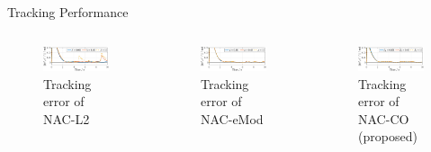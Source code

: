 \documentclass[8pt, aspectratio=169, handout]{beamer}
\begin{document}
\begin{frame}{\insertsubsectionhead}{Tracking Performance}

  \begin{columns}
    

      \begin{figure}      
        \includegraphics[width=0.99\textwidth]{figures/ECC/fig6.eps}
        \caption{Tracking error of NAC-L2}
      \end{figure}
      

      \begin{figure}
        \includegraphics[width=0.99\textwidth]{figures/ECC/fig7.eps}
        \caption{Tracking error of NAC-eMod}
      \end{figure}


      \begin{figure}
        \includegraphics[width=0.99\textwidth]{figures/ECC/fig5.eps}
        \caption{Tracking error of NAC-CO (proposed)}
      \end{figure}


\end{columns}
\end{frame}
\end{document}
